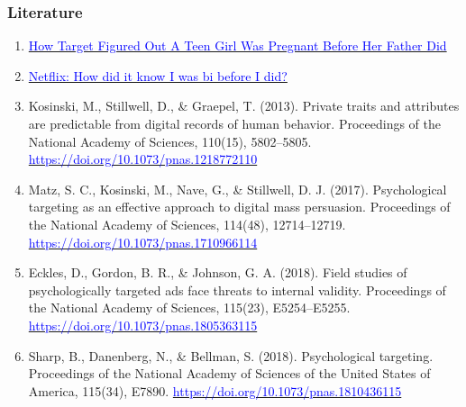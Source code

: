 \documentclass[aspectratio=169]{beamer}
\begin{document}
\begin{frame}
    \frametitle{Literature}
    \scriptsize
    \begin{enumerate}
        \item \href{https://www.forbes.com/sites/kashmirhill/2012/02/16/how-target-figured-out-a-teen-girl-was-pregnant-before-her-father-did/?sh=1333c4646668}{\textcolor{blue}{How Target Figured Out A Teen Girl Was Pregnant Before Her Father Did}}
        \item \href{https://www.bbc.com/news/technology-66472938}{\textcolor{blue}{Netflix: How did it know I was bi before I did?}}
        \item Kosinski, M., Stillwell, D., \& Graepel, T. (2013). Private traits and attributes are predictable from digital records of human behavior. Proceedings of the National Academy of Sciences, 110(15), 5802–5805. \href{https://doi.org/10.1073/pnas.1218772110}{\textcolor{blue}{https://doi.org/10.1073/pnas.1218772110}}
        \item Matz, S. C., Kosinski, M., Nave, G., \& Stillwell, D. J. (2017). Psychological targeting as an effective approach to digital mass persuasion. Proceedings of the National Academy of Sciences, 114(48), 12714–12719. \href{https://doi.org/10.1073/pnas.1710966114}{\textcolor{blue}{https://doi.org/10.1073/pnas.1710966114}}
        \item Eckles, D., Gordon, B. R., \& Johnson, G. A. (2018). Field studies of psychologically targeted ads face threats to internal validity. Proceedings of the National Academy of Sciences, 115(23), E5254–E5255. \href{https://doi.org/10.1073/pnas.1805363115}{\textcolor{blue}{https://doi.org/10.1073/pnas.1805363115}}
        \item Sharp, B., Danenberg, N., \& Bellman, S. (2018). Psychological targeting. Proceedings of the National Academy of Sciences of the United States of America, 115(34), E7890. \href{https://doi.org/10.1073/pnas.1810436115}{\textcolor{blue}{https://doi.org/10.1073/pnas.1810436115}}
    \end{enumerate}
\end{frame}
\end{document}
